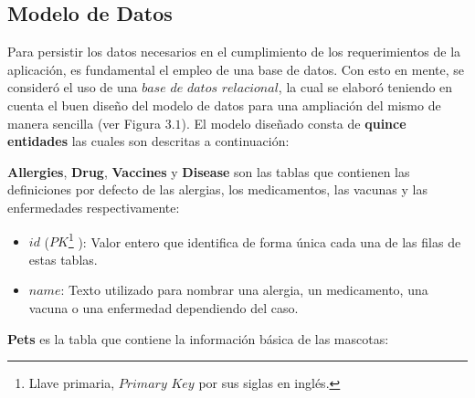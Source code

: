 \subsection{Modelo de Datos}

Para persistir los datos necesarios en el cumplimiento de los requerimientos de la aplicación, es fundamental el empleo de una base de datos. Con esto en mente, se consideró el uso de una $base$ $de$ $datos$ $relacional$, la cual se elaboró teniendo en cuenta el buen diseño del modelo de datos para una ampliación del mismo de manera sencilla  (ver Figura $3.1$). El modelo diseñado consta de \textbf{quince entidades} las cuales son descritas a continuación:

\textbf{Allergies}, \textbf{Drug}, \textbf{Vaccines} y \textbf{Disease} son las tablas que contienen las definiciones por defecto de las alergias, los medicamentos, las vacunas y las enfermedades respectivamente:

\begin{itemize}
\item	$id$ ($PK$\footnote{Llave primaria, $Primary$  $Key$ por sus siglas en inglés.} ): Valor entero que identifica de forma única cada una de las filas de estas tablas.
\item	$name$: Texto utilizado para nombrar una alergia, un medicamento, una vacuna o una enfermedad dependiendo del caso.

\end{itemize}

\textbf{Pets} es la tabla que contiene la información básica de las mascotas:

